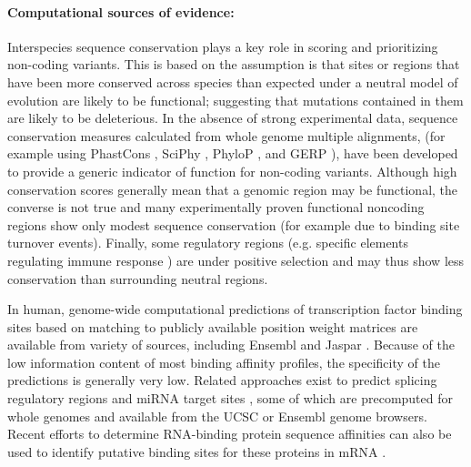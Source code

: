 \paragraph{Computational sources of evidence:} Interspecies sequence conservation plays a key role in scoring and prioritizing non-coding variants. This is based on the assumption is that sites or regions that have been more conserved across species than expected under a neutral model of evolution are likely to be functional; suggesting that mutations contained in them are likely to be deleterious. In the absence of strong experimental data, sequence conservation measures calculated from whole genome multiple alignments, (for example using PhastCons  \cite{siepel2005evolutionarily}, SciPhy  \cite{garber2009identifying}, PhyloP  \cite{pollard2010detection} , and GERP  \cite{davydov2010identifying}), have been developed to provide a generic indicator of function for non-coding variants. Although high conservation scores generally mean that a genomic region may be functional, the converse is not true and many experimentally proven functional noncoding regions show only modest sequence conservation (for example due to binding site turnover events). Finally, some regulatory regions (e.g. specific elements regulating immune response  \cite{raj2013common}) are under positive selection and may thus show less conservation than surrounding neutral regions. 

In human, genome-wide computational predictions of transcription factor binding sites based on matching to publicly available position weight matrices are available from variety of sources, including Ensembl \cite{flicek2012ensembl} and Jaspar  \cite{bryne2008jaspar}.  Because of the low information content of most binding affinity profiles, the specificity of the predictions is generally very low. Related approaches exist to predict splicing regulatory regions  \cite{fairbrother2002predictive} and miRNA target sites \cite{ziebarth2011polymirts}, some of which are precomputed for whole genomes and available from the UCSC or Ensembl genome browsers. Recent efforts to determine RNA-binding protein sequence affinities can also be used to identify putative binding sites for these proteins in mRNA  \cite{ray2013compendium}.

